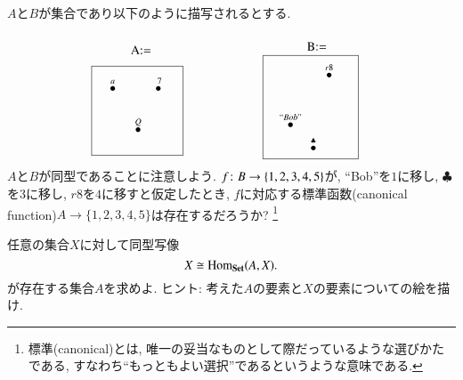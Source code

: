 \begin{exercise}\label{exc:functions are not iso invariant}
$A$と$B$が集合であり以下のように描写されるとする.
$$
\parbox{1.1in}{\boxtitle{A:=}\fbox{\xymatrix@=1pt{\\&\LMO{\;a\;}&&&\LMO{\;\;\;7\;\;}&\\\\\\&&&\LMO{Q}\\&}}}
\hspace{.8in}
\parbox{1.2in}{\boxtitle{B:=}\fbox{\xymatrix@=1pt{&&&\LMO{r8}&&\\\\\\\\&\LMO{``Bob"}\\&&\LMO{\clubsuit}}}}
$$
$A$と$B$が同型であることに注意しよう. $f\colon B\rightarrow\{1,2,3,4,5\}$が, ``Bob''を$1$に移し, $\clubsuit$を$3$に移し, $r8$を$4$に移すと仮定したとき, $f$に対応する標準函数(canonical function)$A\to\{1,2,3,4,5\}$は存在するだろうか?
\footnote{標準(canonical)とは, 唯一の妥当なものとして際だっているような選びかたである, すなわち``もっともよい選択''であるというような意味である.}
\end{exercise}

\begin{exercise}\label{exc:generator for set}
任意の集合$X$に対して同型写像$$X\cong\textrm{Hom}_{\bf Set}(A,X).$$が存在する集合$A$を求めよ. ヒント: 考えた$A$の要素と$X$の要素についての絵を描け.
\end{exercise}

